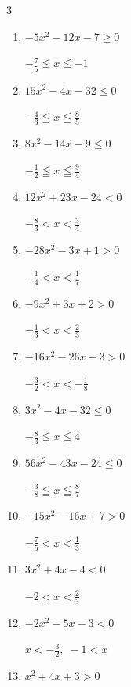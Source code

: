 \begin{multicols}{3}
\begin{enumerate}
  \item $-5x^{2}-12x-7\geq 0$

        $\displaystyle -\frac{7}{5} \leqq x \leqq -1$

  \item $15x^{2}-4x-32\leq 0$

        $\displaystyle -\frac{4}{3} \leqq x \leqq \frac{8}{5}$

  \item $8x^{2}-14x-9\leq 0$

        $\displaystyle -\frac{1}{2} \leqq x \leqq \frac{9}{4}$

  \item $12x^{2}+23x-24<0$

        $\displaystyle -\frac{8}{3} < x < \frac{3}{4}$

  \item $-28x^{2}-3x+1>0$

        $\displaystyle -\frac{1}{4} < x < \frac{1}{7}$

\columnbreak %

  \item $-9x^{2}+3x+2>0$

        $\displaystyle -\frac{1}{3} < x < \frac{2}{3}$

  \item $-16x^{2}-26x-3>0$

        $\displaystyle -\frac{3}{2} < x < -\frac{1}{8}$

  \item $3x^{2}-4x-32\leq 0$

        $\displaystyle -\frac{8}{3} \leqq x \leqq 4$

  \item $56x^{2}-43x-24\leq 0$

        $\displaystyle -\frac{3}{8} \leqq x \leqq \frac{8}{7}$

  \item $-15x^{2}-16x+7>0$

        $\displaystyle -\frac{7}{5} < x < \frac{1}{3}$

  \item $3x^{2}+4x-4<0$

        $\displaystyle -2 < x < \frac{2}{3}$

  \item $-2x^{2}-5x-3<0$

        $\displaystyle x < -\frac{3}{2} , \; -1 < x$

  \item $x^{2}+4x+3>0$


\end{enumerate}
\end{multicols}
